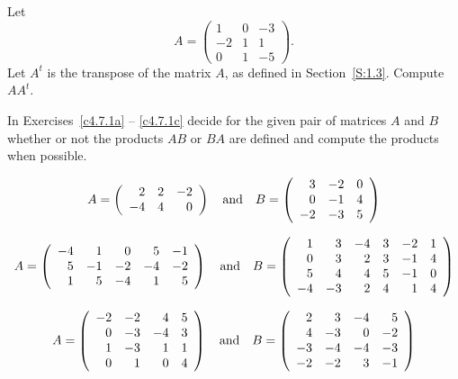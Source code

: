 \begin{exercise} \label{c4.6.3}
Let
\[
A = \left(\begin{array}{rrr} 1 & 0 & -3\\ -2 & 1 & 1 \\ 0 & 1 & -5 \end{array}
\right).
\]
Let $A^t$ is the transpose of the matrix $A$, as defined in
Section~\ref{S:1.3}. Compute $AA^t$.
\end{exercise}

\CEXER

\noindent In Exercises~\ref{c4.7.1a} -- \ref{c4.7.1c} decide for the
given pair of matrices $A$ and $B$ whether or not the products $AB$ or
$BA$ are defined and compute the products when possible.
\begin{exercise} \label{c4.7.1a}
\begin{equation*}
A=\left(\begin{array}{rrr} 2  &  2  & -2 \\ -4  &  4  &  0
\end{array}\right) \quad\mbox{and}\quad
B=\left(\begin{array}{rrr} 3 &  -2  &  0\\ 0 &  -1 &   4\\ -2 &  -3
&   5
\end{array}\right)
\end{equation*}
\end{exercise}
\begin{exercise} \label{c4.7.1b}
\begin{equation*}
A=\left(\begin{array}{rrrrr}  -4  &  1  &  0  &  5  & -1\\
5  & -1  & -2  & -4  & -2\\ 1  &  5 &  -4   & 1  &  5
\end{array}\right) \quad\mbox{and}\quad
B=\left(\begin{array}{rrrrrr} 1  &  3  & -4  &  3  & -2  &  1\\
0  &  3  &  2  &  3  & -1  &  4\\ 5  &  4  &  4  &  5  & -1  &  0\\
-4  & -3  &  2  &  4  &  1  &  4
\end{array}\right)
\end{equation*}
\end{exercise}
\begin{exercise} \label{c4.7.1c}
\begin{equation*}
A=\left(\begin{array}{rrrr}  -2  & -2  &  4  &  5\\
 0  & -3  & -4  &  3\\ 1  & -3  &  1  &  1\\ 0  &  1  &  0  &  4
\end{array}\right) \quad\mbox{and}\quad
B=\left(\begin{array}{rrrr} 2  &  3  & -4  &  5\\
4  & -3  &  0  & -2\\ -3 &  -4  & -4 &  -3\\ -2  & -2  &  3  & -1
\end{array}\right)
\end{equation*}
\end{exercise}



